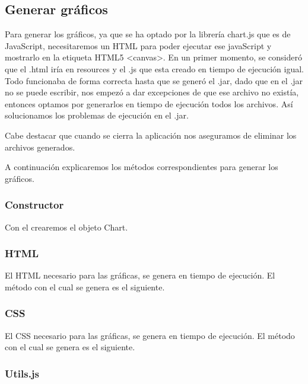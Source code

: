\subsection{Generar gráficos}\label{generar-graficos}

Para generar los gráficos, ya que se ha optado por la librería chart.js que es de JavaScript, necesitaremos un HTML para poder ejecutar ese javaScript y mostrarlo en la etiqueta HTML5 <canvas>. En un primer momento, se consideró que el .html iría en resources y el .js que esta creado en tiempo de ejecución igual. Todo funcionaba de forma correcta hasta que se generó el .jar, dado que en el .jar no se puede escribir, nos empezó a dar excepciones de que ese archivo no existía, entonces optamos por generarlos en tiempo de ejecución todos los archivos. Así solucionamos los problemas de ejecución en el .jar.

Cabe destacar que cuando se cierra la aplicación nos aseguramos de eliminar los archivos generados.

A continuación explicaremos los métodos correspondientes para generar los gráficos.

\subsubsection{Constructor}\label{constructor-c}

Con el crearemos el objeto Chart.


\subsubsection{HTML}\label{html}

El HTML necesario para las gráficas, se genera en tiempo de ejecución. El método con el cual se genera es el siguiente.


\subsubsection{CSS}\label{css}

El CSS necesario para las gráficas, se genera en tiempo de ejecución. El método con el cual se genera es el siguiente.


\subsubsection{Utils.js}\label{utils}

